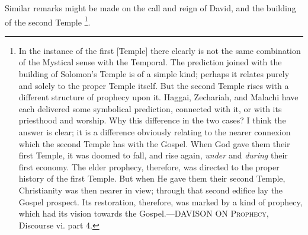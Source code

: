 Similar remarks might be made on the call and reign of David, and
the building of the second Temple \footnote{In the instance of the first [Temple] there
clearly is not the same combination of the Mystical sense with the
Temporal. The prediction joined with the building of Solomon's Temple
is of a simple kind; perhaps it relates purely and solely to the
proper Temple itself. But the second Temple rises with a different
structure of prophecy upon it. Haggai, Zechariah, and Malachi have
each delivered some symbolical prediction, connected with it, or with
its priesthood and worship. Why this difference in the two cases? I
think the answer is clear; it is a difference obviously relating to
the nearer connexion which the second Temple has with the Gospel. When
God gave them their first Temple, it was doomed to fall, and rise
again, \emph{under} and \emph{during} their first economy. The elder
prophecy, therefore, was directed to the proper history of the first
Temple. But when He gave them their second Temple, Christianity was
then nearer in view; through that second edifice lay the Gospel
prospect. Its restoration, therefore, was marked by a kind of
prophecy, which had its vision towards the Gospel.—DAVISON ON
P\textsc{rophecy}, Discourse vi. part 4.}.

